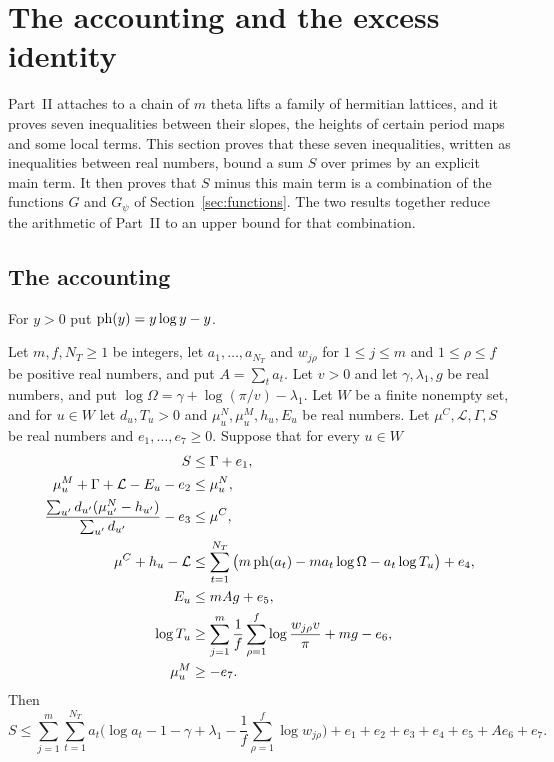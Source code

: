 \section{The accounting and the excess identity}\label{sec:accounting}

Part~II attaches to a chain of $m$ theta lifts a family of hermitian lattices, and it proves seven inequalities between their slopes, the heights of certain period maps and some local terms. This section proves that these seven inequalities, written as inequalities between real numbers, bound a sum $S$ over primes by an explicit main term. It then proves that $S$ minus this main term is a combination of the functions $G$ and $G_\psi$ of Section~\ref{sec:functions}. The two results together reduce the arithmetic of Part~II to an upper bound for that combination.

\subsection{The accounting}\label{sec:acct}

For $y>0$ put $\operatorname{ph}(y)=y\log y-y$.

\begin{proposition}\label{acct}
Let $m,f,N_T\ge1$ be integers, let $a_1,\dots,a_{N_T}$ and $w_{j\rho}$ for $1\le j\le m$ and $1\le\rho\le f$ be positive real numbers, and put $A=\sum_ta_t$. Let $v>0$ and let $\gamma,\lambda_1,g$ be real numbers, and put $\log\Omega=\gamma+\log(\pi/v)-\lambda_1$. Let $W$ be a finite nonempty set, and for $u\in W$ let $d_u,T_u>0$ and $\mu^N_u,\mu^M_u,h_u,E_u$ be real numbers. Let $\mu^C,\mathcal L,\Gamma,S$ be real numbers and $e_1,\dots,e_7\ge0$. Suppose that for every $u\in W$
\begin{align}
S&\le\Gamma+e_1,\label{A1}\\
\mu^M_u+\Gamma+\mathcal L-E_u-e_2&\le\mu^N_u,\label{A2}\\
\frac{\sum_{u'}d_{u'}(\mu^N_{u'}-h_{u'})}{\sum_{u'}d_{u'}}-e_3&\le\mu^C,\label{A3}\\
\mu^C+h_u-\mathcal L&\le\sum_{t=1}^{N_T}\big(m\operatorname{ph}(a_t)-ma_t\log\Omega-a_t\log T_u\big)+e_4,\label{A4}\\
E_u&\le mAg+e_5,\label{A5}\\
\log T_u&\ge\sum_{j=1}^m\frac1f\sum_{\rho=1}^f\log\frac{w_{j\rho}v}{\pi}+mg-e_6,\label{A6}\\
\mu^M_u&\ge-e_7.\label{A7}
\end{align}
Then
\begin{equation}\label{acctconc}
S\le\sum_{j=1}^m\sum_{t=1}^{N_T}a_t\Big(\log a_t-1-\gamma+\lambda_1-\frac1f\sum_{\rho=1}^f\log w_{j\rho}\Big)+e_1+e_2+e_3+e_4+e_5+Ae_6+e_7 .
\end{equation}
\end{proposition}

